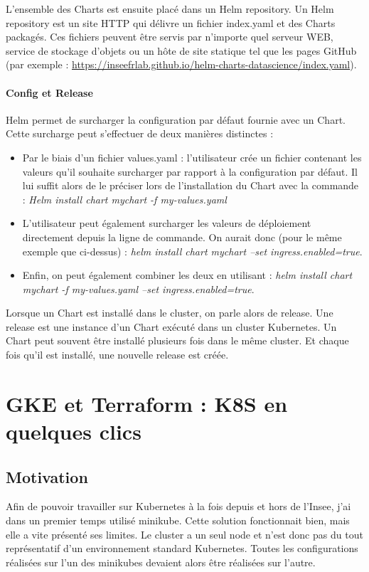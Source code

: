 \documentclass[11pt,fleqn]{book} %
\begin{document}
L'ensemble des Charts est ensuite placé dans un Helm repository. Un Helm repository est un site HTTP qui délivre un fichier index.yaml et des Charts packagés. Ces fichiers peuvent être servis par n'importe quel serveur WEB, service de stockage d'objets ou un hôte de site statique tel que les pages GitHub (par exemple : \url{https://inseefrlab.github.io/helm-charts-datascience/index.yaml}).

\subsubsection{Config et Release}
Helm permet de surcharger la configuration par défaut fournie avec un Chart. Cette surcharge peut s'effectuer de deux manières distinctes :
\begin{itemize}
    \item Par le biais d'un fichier values.yaml : l'utilisateur crée un fichier contenant les valeurs qu'il souhaite surcharger par rapport à la configuration par défaut.
    Il lui suffit alors de le préciser lors de l'installation du Chart avec la commande : \textit{Helm install chart mychart -f my-values.yaml}
    \item L'utilisateur peut également surcharger les valeurs de déploiement directement depuis la ligne de commande. On aurait donc (pour le même exemple que ci-dessus) : \textit{helm install chart mychart --set ingress.enabled=true}.
    \item Enfin, on peut également combiner les deux en utilisant : \textit{helm install chart mychart -f my-values.yaml --set ingress.enabled=true}.\\
\end{itemize}

Lorsque un Chart est installé dans le cluster, on parle alors de release. Une release est une instance d'un Chart exécuté dans un cluster Kubernetes. Un Chart peut souvent être installé plusieurs fois dans le même cluster. Et chaque fois qu'il est installé, une nouvelle release est créée.


\chapter{GKE et Terraform : K8S en quelques clics}
\label{Terraform}
\vspace{-2cm}
\section*{Motivation}
Afin de pouvoir travailler sur Kubernetes à la fois depuis et hors de l'Insee, j'ai dans un premier temps utilisé minikube. Cette solution fonctionnait bien, mais elle a vite présenté ses limites. Le cluster a un seul node et n'est donc pas du tout représentatif d'un environnement standard Kubernetes. Toutes les configurations réalisées sur l'un des minikubes devaient alors être réalisées sur l'autre.\newline
\end{document}
